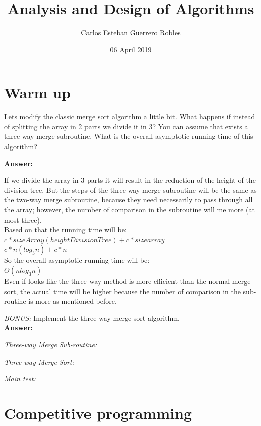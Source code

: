 \documentclass[12pt]{article}
\title{Analysis and Design of Algorithms}
\author{Carlos Esteban Guerrero Robles}
\date{06 April 2019}
\begin{document}
\maketitle

\section{Warm up}

Lets modify the classic merge sort algorithm a little bit. What happens if instead of splitting the array in 2 parts we divide it in 3? You can assume that exists a three-way merge subroutine. What is the overall asymptotic running time of this algorithm?

\textbf{Answer:}

If we divide the array in 3 parts it will result in the reduction of the height of the division tree. But the steps of the three-way merge subroutine will be the same as the two-way merge subroutine, because they need necessarily to pass through all the array; however, the number of comparison in the subroutine will me more (at most three).\\

Based on that the running time will be:\\
$c*sizeArray(heightDivisionTree)+c*sizearray$\\
$c*n(log_3n)+c*n$\\

So the overall asymptotic running time will be:\\
$\Theta(nlog_3n)$\\

Even if looks like the three way method is more efficient than the normal merge sort, the actual time will be higher because the number of comparison in the sub-routine is more as mentioned before.

\emph{BONUS:} Implement the three-way merge sort algorithm.\\

\textbf{Answer:}

\emph{Three-way Merge Sub-routine:}


\emph{Three-way Merge Sort:}


\emph{Main test:}


\section{Competitive programming}
\end{document}
